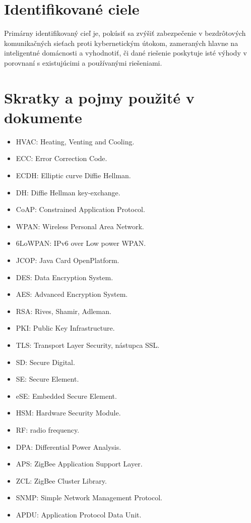 \documentclass[12pt,a4wide,oneside,openright]{report}
\begin{document}
\section{Identifikované ciele}
Primárny identifikovaný cieľ je, pokúsiť sa zvýšiť zabezpečenie v bezdrôtových komunikačných sieťach proti kybernetickým útokom, zameraných hlavne na inteligentné domácnosti a vyhodnotiť, či dané riešenie poskytuje isté výhody v porovnaní s existujúcimi a používanými riešeniami.

\newpage
\singlespacing
\section{Skratky a pojmy použité v dokumente}
\begin{itemize}
	\item HVAC: Heating, Venting and Cooling.
	\item ECC: Error Correction Code.
	\item ECDH: Elliptic curve Diffie Hellman.
	\item DH: Diffie Hellman key-exchange.
	\item CoAP: Constrained Application Protocol.
	\item WPAN: Wireless Personal Area Network.
	\item 6LoWPAN: IPv6 over Low power WPAN.
	\item JCOP: Java Card OpenPlatform.
	\item DES: Data Encryption System.
	\item AES: Advanced Encryption System.
	\item RSA: Rives, Shamir, Adleman.
	\item PKI: Public Key Infrastructure.
	\item TLS: Transport Layer Security, nástupca SSL.
	\item SD: Secure Digital.
	\item SE: Secure Element.
	\item eSE: Embedded Secure Element.
	\item HSM: Hardware Security Module.
	\item RF: radio frequency.
	\item DPA: Differential Power Analysis.
	\item APS: ZigBee Application Support Layer.
	\item ZCL: ZigBee Cluster Library.
	\item SNMP: Simple Network Management Protocol.
	\item APDU: Application Protocol Data Unit.

\end{itemize}
\end{document}
